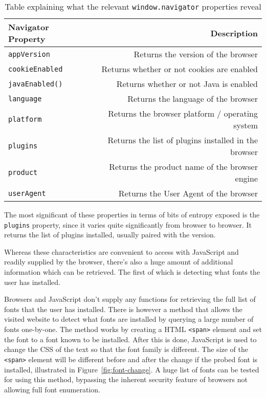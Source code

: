 \begin{table}[h]
\centering
\begin{tabular}{| l | r |}
    \hline
    \textbf{Navigator Property} & \textbf{Description} \\ \hline
    \texttt{appVersion} & {Returns the version of the browser} \\ \hline
    \texttt{cookieEnabled} & {Returns whether or not cookies are enabled} \\ \hline
    \texttt{javaEnabled()} & {Returns whether or not Java is enabled} \\ \hline
    \texttt{language} & {Returns the language of the browser} \\ \hline
    \texttt{platform} & {Returns the browser platform / operating system} \\ \hline
    \texttt{plugins} & {Returns the list of plugins installed in the browser} \\ \hline
    \texttt{product} & {Returns the product name of the browser engine} \\ \hline
    \texttt{userAgent} & {Returns the User Agent of the browser} \\
    \hline
\end{tabular}
\caption{Table explaining what the relevant \texttt{window.navigator} properties reveal}
\label{tab:navigator-props}
\end{table}

The most significant of these properties in terms of bits of entropy exposed is the \texttt{plugins} property, since it varies quite significantly from browser to browser.
It returns the list of plugins installed, usually paired with the version.

Whereas these characteristics are convenient to access with JavaScript and readily supplied by the browser, there's also a huge amount of additional information which can be retrieved.
The first of which is detecting what fonts the user has installed.

Browsers and JavaScript don't supply any functions for retrieving the full list of fonts that the user has installed.
There is however a method that allows the visited website to detect what fonts are installed by querying a large number of fonts one-by-one.
The method works by creating a HTML \texttt{<span>} element and set the font to a font known to be installed.
After this is done, JavaScript is used to change the CSS of the text so that the font family is different.
The size of the \texttt{<span>} element will be different before and after the change if the probed font is installed, illustrated in Figure~\ref{fig:font-change}.
A huge list of fonts can be tested for using this method, bypassing the inherent security feature of browsers not allowing full font enumeration.

